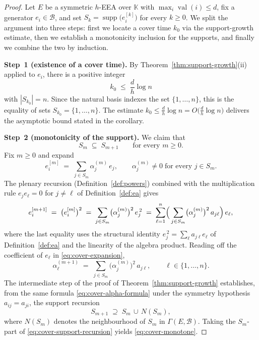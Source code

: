 \documentclass[10pt,a4paper]{amsart}
\newcommand{\EA}{E}          %
\newcommand{\K}{\mathbb{K}}
\newcommand{\natbasis}{\mathcal{B}}  %
\DeclareMathOperator{\supp}{supp}
\DeclareMathOperator{\val}{val}
\begin{document}
\begin{proof}
Let $\EA$ be a symmetric $h$-EEA over $\K$ with $\max_i\val(i)\le d$,
fix a generator $e_i\in\natbasis$, and set $S_k=\supp\bigl(e_i^{[k]}\bigr)$
for every $k\ge 0$.  We split the argument into three steps: first we
locate a cover time $k_0$ via the support-growth estimate, then we
establish a monotonicity inclusion for the supports, and finally we
combine the two by induction.

\medskip
\noindent\textbf{Step~1 (existence of a cover time).}
By Theorem~\ref{thm:support-growth}(ii) applied to $e_i$, there is a
positive integer
\[
  k_0\;\le\;\frac{d}{h}\log n
\]
with $|S_{k_0}|=n$.  Since the natural basis indexes the set
$\{1,\ldots,n\}$, this is the equality of sets
$S_{k_0}=\{1,\ldots,n\}$.  The estimate $k_0\le\frac{d}{h}\log n=
O\!\bigl(\frac{d}{h}\log n\bigr)$ delivers the asymptotic bound stated
in the corollary.

\medskip
\noindent\textbf{Step~2 (monotonicity of the support).}
We claim that
\begin{equation}\label{eq:cover-monotone}
  S_m\;\subseteq\;S_{m+1}
  \qquad\text{for every }m\ge 0.
\end{equation}
Fix $m\ge 0$ and expand
\[
  e_i^{[m]}\;=\;\sum_{j\in S_m}\alpha_j^{(m)}\,e_j,
  \qquad \alpha_j^{(m)}\ne 0\;\text{for every }j\in S_m.
\]
The plenary recursion (Definition~\ref{def:powers}) combined with the
multiplication rule $e_je_\ell=0$ for $j\ne\ell$ of
Definition~\ref{def:ea} gives
\begin{equation}\label{eq:cover-expansion}
  e_i^{[m+1]}
  \;=\;\bigl(e_i^{[m]}\bigr)^{2}
  \;=\;\sum_{j\in S_m}\bigl(\alpha_j^{(m)}\bigr)^{2}\,e_j^{\,2}
  \;=\;\sum_{\ell=1}^{n}
        \Bigl(\,\sum_{j\in S_m}\bigl(\alpha_j^{(m)}\bigr)^{2}\,a_{j\ell}\Bigr)\,e_\ell,
\end{equation}
where the last equality uses the structural identity
$e_j^{\,2}=\sum_{\ell}a_{j\ell}e_\ell$ of Definition~\ref{def:ea} and
the linearity of the algebra product.  Reading off the coefficient of
$e_\ell$ in \eqref{eq:cover-expansion},
\begin{equation}\label{eq:cover-alpha-formula}
  \alpha_\ell^{(m+1)}
  \;=\;\sum_{j\in S_m}\bigl(\alpha_j^{(m)}\bigr)^{2}\,a_{j\ell},
  \qquad
  \ell\in\{1,\ldots,n\}.
\end{equation}
The intermediate step of the proof of
Theorem~\ref{thm:support-growth} establishes, from the same formula
\eqref{eq:cover-alpha-formula} under the symmetry hypothesis
$a_{ij}=a_{ji}$, the support recursion
\begin{equation}\label{eq:cover-support-recursion}
  S_{m+1}\;\supseteq\;S_m\,\cup\,N(S_m),
\end{equation}
where $N(S_m)$ denotes the neighbourhood of $S_m$ in
$\varGamma(\EA,\natbasis)$.  Taking the $S_m$-part of
\eqref{eq:cover-support-recursion} yields
\eqref{eq:cover-monotone}.


\end{proof}
\end{document}
